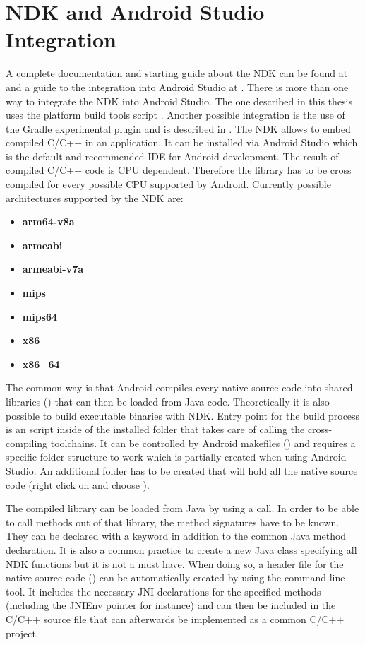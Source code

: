 \section{NDK and Android Studio Integration}\label{section:ndk_integration}
A complete documentation and starting guide about the NDK can be found at \parencite{ndk} and a guide to the integration into Android Studio at \parencite{ndk_integration}.
There is more than one way to integrate the NDK into Android Studio. The one described
in this thesis uses the platform build tools script . Another possible
integration is the use of the Gradle experimental plugin and is described in \parencite{gradle_experimental}.
The NDK allows to embed compiled C/C++ in an application. It can be installed via Android Studio which is the default and recommended IDE for Android development.
The result of compiled C/C++ code is CPU dependent. Therefore the library has to be cross compiled for
every possible CPU supported by Android. Currently possible architectures supported by the NDK are:
\begin{itemize}
\item \textbf{arm64-v8a}
\item \textbf{armeabi}
\item \textbf{armeabi-v7a}
\item \textbf{mips}
\item \textbf{mips64}
\item \textbf{x86}
\item \textbf{x86\_64}
\end{itemize}
The common way is that Android compiles every native source code into shared libraries
() that can then be loaded from Java code. Theoretically it is also possible to build executable binaries with NDK. Entry point for the build process is an  script inside of the installed  folder that takes care of calling the cross-compiling toolchains. It can be controlled by Android makefiles () and requires a specific folder structure to work which is partially created when using Android Studio. An additional  folder has to be created that will hold all the native source code (right click on  and choose ).

The compiled library can be loaded from Java by using a
 call.
In order to be able to call methods out
of that library, the method signatures have to be known. They can be declared with a  keyword in addition to the common Java method declaration. It is also a
common practice to create a new Java class specifying all NDK functions but it is not a must have. When doing so, a header file for the native source code () can be automatically
created by using the  command line tool. It includes the necessary JNI
declarations for the specified methods (including the JNIEnv pointer for instance)
and can then be included in the C/C++ source file that can afterwards be implemented as a
common C/C++ project.

